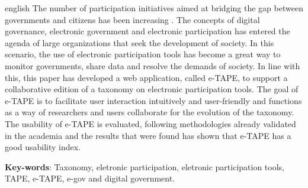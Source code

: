 \begin{resumo}[Abstract]
 \begin{otherlanguage*}{english}
The number of participation initiatives aimed at bridging the gap between governments and citizens has been increasing .
The concepts of digital governance, electronic government and electronic participation has entered the agenda of large organizations that seek the development of society.
In this scenario, the use of electronic participation tools has become a great way to monitor governments, share data and resolve the demands of society.
In line with this, this paper has developed a web application, called e-TAPE, to support a collaborative edition of a taxonomy on electronic participation tools.
The goal of e-TAPE is to facilitate user interaction intuitively and user-friendly and functions as a way of researchers and users collaborate for the evolution of the taxonomy.
The usability of e-TAPE is evaluated, following methodologies already validated in the academia and the results that were found has shown that e-TAPE has a good usability index.

\textbf{Key-words}: Taxonomy, eletronic participation, eletronic participation tools, TAPE, e-TAPE, e-gov and digital government.
 \end{otherlanguage*}
\end{resumo}
\newpage